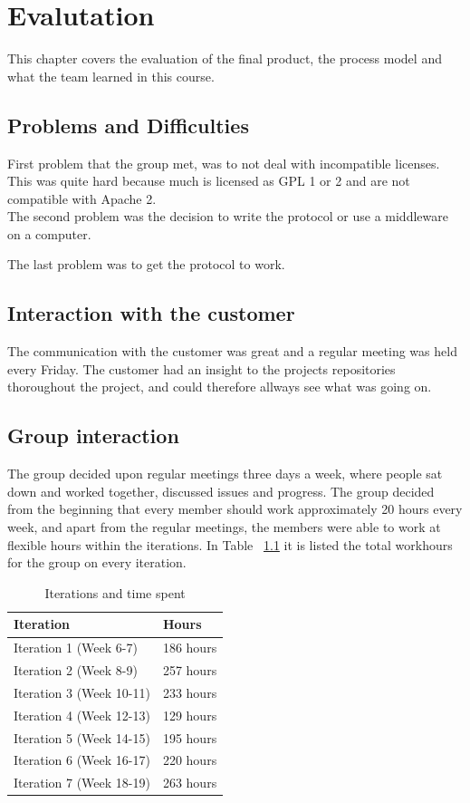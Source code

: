 \chapter{Evalutation}

This chapter covers the evaluation of the final product, the process model and what the team learned in this course.

\section{Problems and Difficulties}
	First problem that the group met, was to not deal with incompatible licenses. This was quite hard because much is licensed as GPL 1 or 2 and are not compatible with Apache 2. \\

	The second problem was the decision to write the protocol or use a middleware on a computer.

	The last problem was to get the protocol to work.

\section{Interaction with the customer}
	The communication with the customer was great and a regular meeting was held every Friday. The customer had an insight to the projects repositories thoroughout the project, and could therefore allways see what was going on.


\section{Group interaction}
	The group decided upon regular meetings three days a week, where people sat down and worked together, discussed issues and progress.	The group decided from the beginning that every member should work approximately 20 hours every week, and apart from the regular meetings, the members were able to work at flexible hours within the iterations.
	In Table ~\ref{table:workhours} it is listed the total workhours for the group on every iteration.

	\begin{table}[H]
	\caption{Iterations and time spent}
	\centering
	\label{table:workhours}
	\begin{tabular}{|l|l|}
		\hline
			{\bf Iteration} & {\bf Hours}\\
		\hline
			Iteration 1 (Week 6-7) & 186 hours\\
		\hline
			Iteration 2 (Week 8-9) & 257 hours\\
		\hline
			Iteration 3 (Week 10-11) & 233 hours\\
		\hline
			Iteration 4 (Week 12-13) & 129 hours\\
		\hline
			Iteration 5 (Week 14-15) & 195 hours\\
		\hline
			Iteration 6 (Week 16-17) & 220 hours\\
		\hline
			Iteration 7 (Week 18-19) & 263 hours\\
		\hline
	\end{tabular}
	\end{table}

